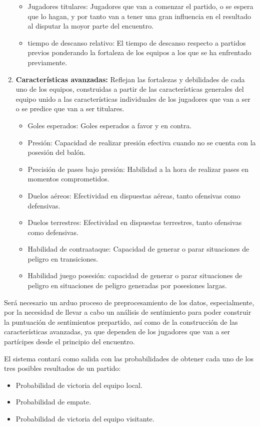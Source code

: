 \begin{enumerate}
\begin{itemize}
        \item Jugadores titulares: Jugadores que van a comenzar el partido, o se espera que lo hagan, y por tanto van a tener una gran influencia en el resultado al disputar la moyor parte del encuentro.
        \item tiempo de descanso relativo: El tiempo de descanso respecto a partidos previos ponderando la fortaleza de los equipos a los que se ha enfrentado previamente. 
    \end{itemize}
    \item \textbf{Características avanzadas:} Reflejan las fortalezas y debilidades de cada uno de los equipos, construidas a partir de las características generales del equipo unido a las características individuales de los jugadores que van a ser o se predice que van a ser titulares.
    \begin{itemize}
        \item Goles esperados: Goles esperados a favor y en contra.
        \item Presión: Capacidad de realizar presión efectiva cuando no se cuenta con la posesión del balón.
        \item Precisión de pases bajo presión: Habilidad a la hora de realizar pases en momentos comprometidos.
        \item Duelos aéreos: Efectividad en dispuestas aéreas, tanto ofensivas como defensivas.
        \item Duelos terrestres: Efectividad en dispuestas terrestres, tanto ofensivas como defensivas.
        \item Habilidad de contraataque: Capacidad de generar o parar situaciones de peligro en transiciones.
         \item Habilidad juego posesión: capacidad de generar o parar situaciones de peligro en situaciones de peligro generadas por posesiones largas.
    \end{itemize}
\end{enumerate}

Será necesario un arduo proceso de preprocesamiento de los datos, especialmente, por la necesidad de llevar a cabo un análisis de sentimiento para poder construir la puntuación de sentimientos prepartido, así como de la construcción de las características avanzadas, ya que dependen de los jugadores que van a ser partícipes desde el principio del encuentro.

El sistema contará como salida con las probabilidades de obtener cada uno de los tres posibles resultados de un partido:
\begin{itemize}
    \item Probabilidad de victoria del equipo local.
    \item Probabilidad de empate.
    \item Probabilidad de victoria del equipo visitante.
\end{itemize}

